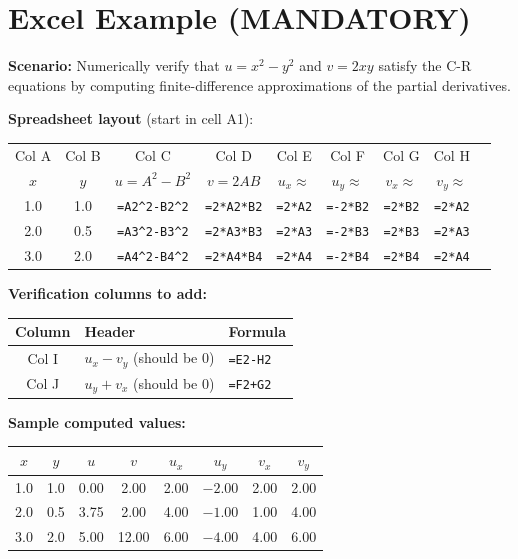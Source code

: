 \documentclass[12pt,a4paper]{article}
\begin{document}
\section{Excel Example (MANDATORY)}

\textbf{Scenario:} Numerically verify that $u=x^2-y^2$ and $v=2xy$ satisfy the C-R
equations by computing finite-difference approximations of the partial derivatives.

\medskip
\textbf{Spreadsheet layout} (start in cell A1):

\begin{center}
\begin{tabular}{@{}ccccccccc@{}}
\toprule
Col A & Col B & Col C & Col D & Col E & Col F & Col G & Col H \\
$x$ & $y$ & $u=A^2-B^2$ & $v=2AB$ & $u_x\approx$ & $u_y\approx$ & $v_x\approx$ & $v_y\approx$ \\
\midrule
1.0 & 1.0 & \texttt{=A2\^{}2-B2\^{}2} & \texttt{=2*A2*B2} & \texttt{=2*A2} & \texttt{=-2*B2} & \texttt{=2*B2} & \texttt{=2*A2} \\
2.0 & 0.5 & \texttt{=A3\^{}2-B3\^{}2} & \texttt{=2*A3*B3} & \texttt{=2*A3} & \texttt{=-2*B3} & \texttt{=2*B3} & \texttt{=2*A3} \\
3.0 & 2.0 & \texttt{=A4\^{}2-B4\^{}2} & \texttt{=2*A4*B4} & \texttt{=2*A4} & \texttt{=-2*B4} & \texttt{=2*B4} & \texttt{=2*A4} \\
\bottomrule
\end{tabular}
\end{center}

\textbf{Verification columns to add:}

\begin{center}
\begin{tabular}{@{}cll@{}}
\toprule
Column & Header & Formula \\
\midrule
Col I & $u_x - v_y$ (should be 0) & \texttt{=E2-H2} \\
Col J & $u_y + v_x$ (should be 0) & \texttt{=F2+G2} \\
\bottomrule
\end{tabular}
\end{center}

\textbf{Sample computed values:}

\begin{center}
\begin{tabular}{@{}cccccccc@{}}
\toprule
$x$ & $y$ & $u$ & $v$ & $u_x$ & $u_y$ & $v_x$ & $v_y$ \\
\midrule
1.0 & 1.0 & 0.00 & 2.00 & 2.00 & $-2.00$ & 2.00 & 2.00 \\
2.0 & 0.5 & 3.75 & 2.00 & 4.00 & $-1.00$ & 1.00 & 4.00 \\
3.0 & 2.0 & 5.00 & 12.00 & 6.00 & $-4.00$ & 4.00 & 6.00 \\
\bottomrule
\end{tabular}
\end{center}
\end{document}
